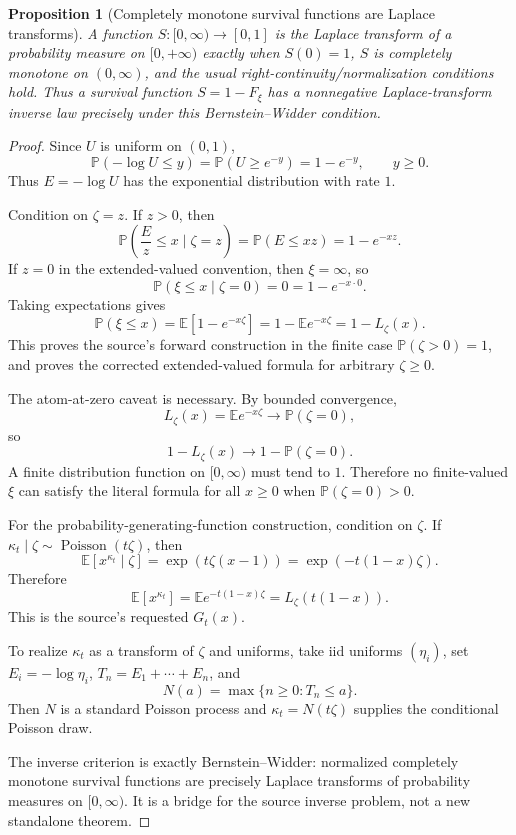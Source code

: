 \documentclass[11pt]{article}
\numberwithin{equation}{section}
\newtheorem{proposition}[theorem]{Proposition}
\theoremstyle{definition}
\theoremstyle{remark}
\newcommand{\1}{\mathbf 1}
\begin{document}
\begin{proposition}[Completely monotone survival functions are Laplace transforms]
\label{res:cmsurvival-bernsteinwidder-inversecriterion}
A function \(S:[0,\infty)\to[0,1]\) is the Laplace transform of a probability measure on \([0, +\infty)\) exactly when \(S(0)=1\), \(S\) is completely monotone on \((0,\infty)\), and the usual right-continuity/normalization conditions hold. Thus a survival function \(S=1-F_\xi\) has a nonnegative Laplace-transform inverse law precisely under this Bernstein--Widder condition.
\end{proposition}

\begin{proof}
Since \(U\) is uniform on \((0,1)\),
\[
\mathbb P(-\log U\le y)=\mathbb P(U\ge e^{-y})=1-e^{-y},\qquad y\ge0.
\]
Thus \(E=-\log U\) has the exponential distribution with rate \(1\).

Condition on \(\zeta=z\). If \(z>0\), then
\[
\mathbb P\left(\frac{E}{z}\le x\mid \zeta=z\right)
=\mathbb P(E\le xz)=1-e^{-xz}.
\]
If \(z=0\) in the extended-valued convention, then \(\xi=\infty\), so
\[
\mathbb P(\xi\le x\mid \zeta=0)=0=1-e^{-x\cdot 0}.
\]
Taking expectations gives
\[
\mathbb P(\xi\le x)
=\mathbb E[1-e^{-x\zeta}]
=1-\mathbb E e^{-x\zeta}
=1-L_\zeta(x).
\]
This proves the source's forward construction in the finite case \(\mathbb P(\zeta>0)=1\), and proves the corrected extended-valued formula for arbitrary \(\zeta\ge0\).

The atom-at-zero caveat is necessary. By bounded convergence,
\[
L_\zeta(x)=\mathbb E e^{-x\zeta}\longrightarrow \mathbb P(\zeta=0),
\]
so
\[
1-L_\zeta(x)\longrightarrow 1-\mathbb P(\zeta=0).
\]
A finite distribution function on \([0,\infty)\) must tend to \(1\). Therefore no finite-valued \(\xi\) can satisfy the literal formula for all \(x\ge0\) when \(\mathbb P(\zeta=0)>0\).

For the probability-generating-function construction, condition on \(\zeta\). If \(\kappa_t\mid \zeta\sim\operatorname{Poisson}(t\zeta)\), then
\[
\mathbb E[x^{\kappa_t}\mid\zeta]
=\exp(t\zeta(x-1))
=\exp(-t(1-x)\zeta).
\]
Therefore
\[
\mathbb E[x^{\kappa_t}]
=\mathbb E e^{-t(1-x)\zeta}
=L_\zeta(t(1-x)).
\]
This is the source's requested \(G_t(x)\).

To realize \(\kappa_t\) as a transform of \(\zeta\) and uniforms, take iid uniforms \((\eta_i)\), set \(E_i=-\log\eta_i\), \(T_n=E_1+\cdots+E_n\), and
\[
N(a)=\max\{n\ge0:T_n\le a\}.
\]
Then \(N\) is a standard Poisson process and \(\kappa_t=N(t\zeta)\) supplies the conditional Poisson draw.

The inverse criterion is exactly Bernstein--Widder: normalized completely monotone survival functions are precisely Laplace transforms of probability measures on \([0,\infty)\). It is a bridge for the source inverse problem, not a new standalone theorem.
\end{proof}
\end{document}
